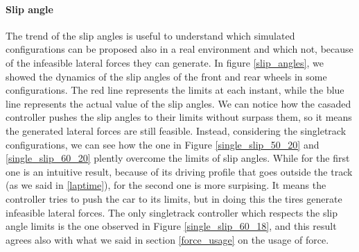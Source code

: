 \documentclass[a4paper, onecolumn, 11pt]{article}
\begin{document}
\paragraph{Slip angle}
The trend of the slip angles is useful to understand which simulated configurations can be
proposed also in a real environment and which not, because of the infeasible lateral forces
they can generate. In figure \ref{slip_angles}, we showed the dynamics of the slip angles of 
the front and rear wheels in some configurations. The red line represents the limits at
each instant, while the blue line represents the actual value of the slip angles. 
We can notice how the casaded controller pushes the slip angles to their limits
without surpass them, so it means the generated lateral forces are still feasible.
Instead, considering the singletrack configurations, we can see how the one in Figure
\ref{single_slip_50_20} and \ref{single_slip_60_20} plently overcome the limits of slip angles.
While for the first one is an intuitive result, because of its driving profile that goes outside
the track (as we said in \ref{laptime}), for the second one is more surpising. It means the 
controller tries to push the car to its limits, but in doing this the tires generate infeasible
lateral forces. The only singletrack controller which respects the slip angle limits is the
one observed in Figure \ref{single_slip_60_18}, and this result agrees also with what we said 
in section \ref{force_usage} on the usage of force.
\end{document}

